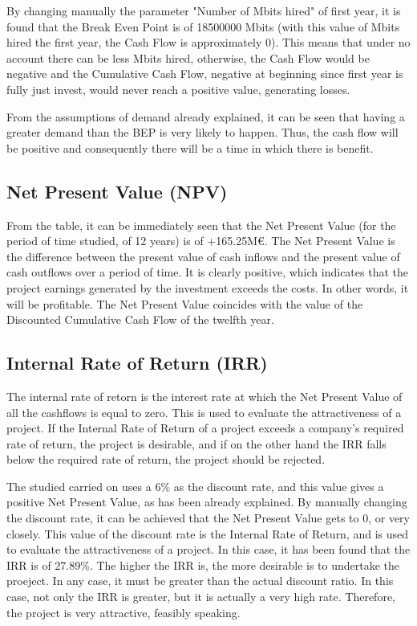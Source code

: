 By changing manually the parameter "Number of Mbits hired" of first year, it is found that the Break Even Point is of 18500000 Mbits (with this value of Mbits hired the first year, the Cash Flow is approximately 0). This means that under no account there can be less Mbits hired, otherwise, the Cash Flow would be negative and the Cumulative Cash Flow, negative at beginning since first year is fully just invest, would never reach a positive value, generating losses. 

From the assumptions of demand already explained, it can be seen that having a greater demand than the BEP is very likely to happen. Thus, the cash flow will be positive and consequently there will be a time in which there is benefit.

\subsection{Net Present Value (NPV)}
From the table, it can be immediately seen that the Net Present Value (for the period of time studied, of 12 years) is of +165.25M\euro. The Net Present Value is the difference between the present value of cash inflows and the present value of cash outflows over a period of time. It is clearly positive, which indicates that the project earnings generated by the investment exceeds the costs. In other words, it will be profitable. The Net Present Value coincides with the value of the Discounted Cumulative Cash Flow of the twelfth year. 


\subsection{Internal Rate of Return (IRR)}
The internal rate of retorn is the interest rate at which the Net Present Value of all the cashflows is equal to zero. This is used to evaluate the attractiveness of a project. If the Internal Rate of Return of a project exceeds a company's required rate of return, the project is desirable, and if on the other hand the IRR falls below the required rate of return, the project should be rejected.

The studied carried on uses a 6\% as the discount rate, and this value gives a positive Net Present Value, as has been already explained. By manually changing the discount rate, it can be achieved that the Net Present Value gets to 0, or very closely. This value of the discount rate is the Internal Rate of Return, and is used to evaluate the attractiveness of a project. In this case, it has been found that the IRR is of 27.89\%. The higher the IRR is, the more desirable is to undertake the proeject. In any case, it must be greater than the actual discount ratio. In this case, not only the IRR is greater, but it is actually a very high rate. Therefore, the project is very attractive, feasibly speaking. 

